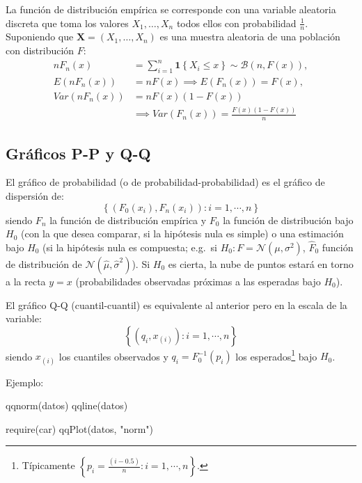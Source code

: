 \documentclass[
]{book}
\newenvironment{Shaded}{\begin{snugshade}}{\end{snugshade}}
\newcommand{\FunctionTok}[1]{\textcolor[rgb]{0.00,0.00,0.00}{#1}}
\newcommand{\NormalTok}[1]{#1}
\newcommand{\StringTok}[1]{\textcolor[rgb]{0.31,0.60,0.02}{#1}}
\theoremstyle{break}
\theoremstyle{nonumberplain}
\begin{document}
La función de distribución empírica se corresponde con una variable aleatoria discreta que toma los valores
\(X_1,\ldots ,X_n\) todos ellos con probabilidad \(\frac{1}{n}\).
Suponiendo que \(\mathbf{X}=\left( X_1,\ldots ,X_n \right)\) es una muestra aleatoria de una población con distribución \(F\):
\[\begin{aligned}
nF_n\left( x \right) &= \sum_{i=1}^{n}\mathbf{1}\left\{ X_i\leq x\right\}
\sim \mathcal{B}\left( n,F\left( x \right) \right), \\
E\left( nF_n\left( x \right) \right) &= nF\left( x \right) \implies E\left(
F_n\left( x \right) \right) =F\left( x \right), \\
Var\left( nF_n\left( x \right) \right) &=  nF\left( x \right) \left(
1-F\left( x \right) \right) \\
&\implies  Var\left( F_n\left( x \right) \right) =\frac{F\left( x \right) \left( 1-F\left( x \right) \right)}{n}
\end{aligned}\]

\hypertarget{gruxe1ficos-p-p-y-q-q}{%
\subsection{Gráficos P-P y Q-Q}\label{gruxe1ficos-p-p-y-q-q}}

El gráfico de probabilidad (o de probabilidad-probabilidad) es el gráfico de dispersión de:
\[\left \{  \left( F_0(x_{i}), F_n(x_{i}) \right)  :i=1,\cdots,n\right \}\]
siendo \(F_n\) la función de distribución empírica y \(F_0\) la función de distribución bajo \(H_0\) (con la que desea comparar, si la hipótesis nula es simple) o una estimación bajo \(H_0\) (si la hipótesis nula es compuesta; e.g.~si \(H_0:F= \mathcal{N}(\mu,\sigma^2)\),
\(\hat{F}_0\) función de distribución de \(\mathcal{N}(\hat{\mu},\hat{\sigma}^2)\)).
Si \(H_0\) es cierta, la nube de puntos estará en torno a la recta \(y=x\) (probabilidades observadas próximas a las esperadas bajo \(H_0\)).

El gráfico Q-Q (cuantil-cuantil) es equivalente al anterior pero en la escala de la variable:
\[\left\{ \left( q_{i}, x_{(i)}\right) : i=1, \cdots, n \right\}\]
siendo \(x_{(i)}\) los cuantiles observados y \(q_{i}=F_0^{-1}(p_{i})\) los esperados\footnote{Típicamente \(\left \{ p_{i}=\frac{\left(i-0.5 \right)}n : i=1, \cdots, n \right\}\).} bajo \(H_0\).

Ejemplo:

\begin{Shaded}
\begin{Highlighting}[]
\FunctionTok{qqnorm}\NormalTok{(datos)}
\FunctionTok{qqline}\NormalTok{(datos)}

\FunctionTok{require}\NormalTok{(car)}
\FunctionTok{qqPlot}\NormalTok{(datos, }\StringTok{"norm"}\NormalTok{)}
\end{Highlighting}
\end{Shaded}
\end{document}
